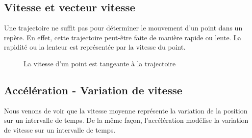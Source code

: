 \subsection{Vitesse et vecteur vitesse}
Une trajectoire ne suffit pas pour déterminer le mouvement d'un point dans un repère. En effet, cette trajectoire peut-être faite de manière rapide ou lente. La rapidité ou la lenteur est représentée par la vitesse du point.


\begin{figure}
  \centering
  
  \caption{La vitesse d'un point est tangeante à la trajectoire}
  \label{fig:exemple}
\end{figure}



\begin{UPSTIactivite}
  \begin{center}
    
  \end{center}
\end{UPSTIactivite}


\subsection{Accélération - Variation de vitesse}
Nous venons de voir que la vitesse moyenne représente la variation de la position sur un intervalle de temps. De la même façon, l'accélération modélise la variation de vitesse sur un intervalle de temps.

